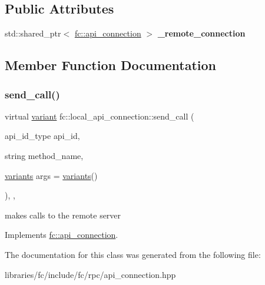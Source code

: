 \subsection*{Public Attributes}
\begin{DoxyCompactItemize}
\item 
\mbox{\label{classfc_1_1local__api__connection_a0cd16ae77357c3289ed1f0a52ca10cf3}} 
std\+::shared\+\_\+ptr$<$ \mbox{\hyperlink{classfc_1_1api__connection}{fc\+::api\+\_\+connection}} $>$ {\bfseries \+\_\+remote\+\_\+connection}
\end{DoxyCompactItemize}


\subsection{Member Function Documentation}
\mbox{\label{classfc_1_1local__api__connection_a95994755615aedc3f14f7ac7e5085a00}} 
\subsubsection{\texorpdfstring{send\+\_\+call()}{send\_call()}}
{\footnotesize\ttfamily virtual \mbox{\hyperlink{classfc_1_1variant}{variant}} fc\+::local\+\_\+api\+\_\+connection\+::send\+\_\+call (\begin{DoxyParamCaption}\item[{api\+\_\+id\+\_\+type}]{api\+\_\+id,  }\item[{string}]{method\+\_\+name,  }\item[{\mbox{\hyperlink{classstd_1_1vector}{variants}}}]{args = {\ttfamily \mbox{\hyperlink{classstd_1_1vector}{variants}}()} }\end{DoxyParamCaption})\hspace{0.3cm}{\ttfamily [inline]}, {\ttfamily [override]}, {\ttfamily [virtual]}}

makes calls to the remote server 

Implements \mbox{\hyperlink{classfc_1_1api__connection_a38d046b1803e1242ce10f36c694b9dea}{fc\+::api\+\_\+connection}}.



The documentation for this class was generated from the following file\+:\begin{DoxyCompactItemize}
\item 
libraries/fc/include/fc/rpc/api\+\_\+connection.\+hpp\end{DoxyCompactItemize}

